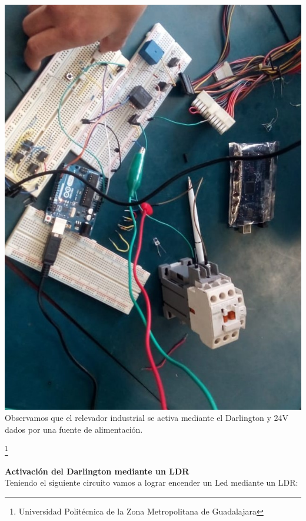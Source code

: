 \documentclass[10pt,a4paper]{article}
\begin{document}
\centering
\includegraphics[scale=0.3]{7.jpeg}
\\

Observamos que el relevador industrial se activa mediante el Darlington y 24V dados por una fuente de alimentación.

\footnote{Universidad Politécnica de la Zona Metropolitana de Guadalajara}
 
\newpage
\textbf{Activación del Darlington mediante un LDR}\\
Teniendo el siguiente circuito vamos a lograr encender un Led mediante un LDR:\\
\end{document}
